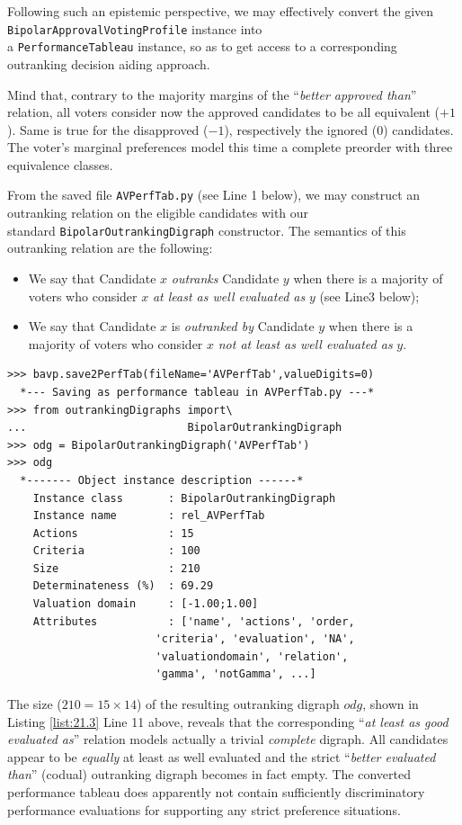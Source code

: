 Following such an epistemic perspective, we may effectively convert the given \texttt{BipolarApprovalVotingProfile} instance into\\ a \texttt{PerformanceTableau} instance, so as to get access to a corresponding outranking decision aiding approach.

Mind that, contrary to the majority margins of the ``\emph{better approved than}'' relation, all voters consider now the approved candidates to be all equivalent ($+1$). Same is true for the disapproved ($-1$), respectively the ignored ($0$) candidates. The voter's marginal preferences model this time a complete preorder with three equivalence classes. 

From the saved file \texttt{AVPerfTab.py} (see Line 1 below), we may construct an outranking relation on the eligible candidates with our \\ standard \texttt{BipolarOutrankingDigraph} constructor. The semantics of this outranking relation are the following:
\begin{itemize}
\item We say that Candidate $x$ \emph{outranks} Candidate $y$ when there is a majority of voters who consider $x$ \emph{at least as well evaluated as} $y$ (see Line3 below);
\item We say that Candidate $x$ is \emph{outranked by} Candidate $y$ when there is a majority of voters who consider $x$ \emph{not at least as well evaluated as} $y$.
\end{itemize}
\begin{lstlisting}[caption={Computing the outranking digraph},label=list:21.3]
>>> bavp.save2PerfTab(fileName='AVPerfTab',valueDigits=0)
  *--- Saving as performance tableau in AVPerfTab.py ---*
>>> from outrankingDigraphs import\
...                         BipolarOutrankingDigraph
>>> odg = BipolarOutrankingDigraph('AVPerfTab')
>>> odg
  *------- Object instance description ------*
    Instance class       : BipolarOutrankingDigraph
    Instance name        : rel_AVPerfTab
    Actions              : 15
    Criteria             : 100
    Size                 : 210
    Determinateness (%)  : 69.29
    Valuation domain     : [-1.00;1.00]
    Attributes           : ['name', 'actions', 'order,
                       'criteria', 'evaluation', 'NA',
                       'valuationdomain', 'relation',
                       'gamma', 'notGamma', ...]
\end{lstlisting}
The size ($210 = 15 \times 14$) of the resulting outranking digraph $odg$, shown in Listing \ref{list:21.3} Line 11 above, reveals that the corresponding ``\emph{at least as good evaluated as}'' relation models actually a trivial \emph{complete} digraph. All candidates appear to be \emph{equally} at least as well evaluated and the strict ``\emph{better evaluated than}'' (codual) outranking digraph becomes in fact empty. The converted performance tableau does apparently not contain sufficiently discriminatory performance evaluations for supporting any strict preference situations.

